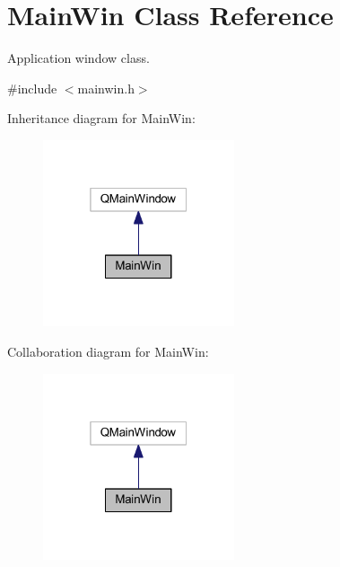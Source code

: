 \hypertarget{class_main_win}{\section{Main\-Win Class Reference}
\label{class_main_win}
}


Application window class.  




{\ttfamily \#include $<$mainwin.\-h$>$}



Inheritance diagram for Main\-Win\-:
\nopagebreak
\begin{figure}[H]
\begin{center}
\leavevmode
\includegraphics[width=160pt]{class_main_win__inherit__graph}
\end{center}
\end{figure}


Collaboration diagram for Main\-Win\-:
\nopagebreak
\begin{figure}[H]
\begin{center}
\leavevmode
\includegraphics[width=160pt]{class_main_win__coll__graph}
\end{center}
\end{figure}
